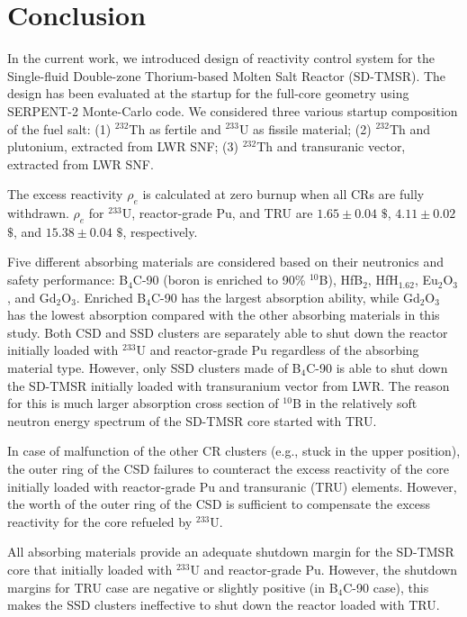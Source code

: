 \section{Conclusion} \label{Conclusion}
In the current work, we introduced design of reactivity control system for the 
Single-fluid Double-zone Thorium-based Molten Salt Reactor (SD-TMSR). The 
design has been evaluated at the startup for the full-core geometry using 
SERPENT-2 Monte-Carlo code. We considered three various startup composition of 
the fuel salt: (1) $^{232}$Th as fertile and $^{233}$U as fissile material; 
(2) $^{232}$Th and plutonium, extracted from \gls{LWR} \gls{SNF}; (3) 
$^{232}$Th and transuranic vector, extracted from \gls{LWR} \gls{SNF}.

The excess reactivity $\rho_e$ is calculated at zero burnup when all CRs are 
fully withdrawn. $\rho_e$ for $^{233}$U, reactor-grade Pu, and 
TRU are $1.65\pm0.04$ $\$$, $4.11\pm0.02$ $\$$, and $15.38\pm0.04$ $\$$, 
respectively.

Five different absorbing materials are considered based on their neutronics and 
safety performance: B$_4$C-90 (boron is enriched to 90\% $^{10}$B), HfB$_2$, 
HfH$_{1.62}$, Eu$_2$O$_3$, and Gd$_2$O$_3$. Enriched B$_4$C-90 has the largest 
absorption ability, while Gd$_2$O$_3$ has the lowest absorption compared with 
the other absorbing materials in this study. Both CSD and SSD clusters are 
separately able to shut down the reactor initially loaded with $^{233}$U and 
reactor-grade Pu regardless of the absorbing material type. However, only SSD 
clusters made of B$_4$C-90 is able to shut down the SD-TMSR initially loaded 
with transuranium vector from \gls{LWR}. The reason for this is much larger 
absorption cross section of $^{10}$B in the relatively soft neutron energy 
spectrum of the SD-TMSR core started with TRU.

In case of malfunction of the other CR clusters (e.g., stuck in the upper 
position), the outer ring of the CSD failures to counteract the excess 
reactivity of the core initially loaded with reactor-grade Pu and transuranic 
(TRU) elements. However, the worth of the outer ring of the CSD is sufficient 
to compensate the excess reactivity for the core refueled by $^{233}$U.

All absorbing materials provide an adequate shutdown margin for the SD-TMSR 
core that initially loaded with $^{233}$U and reactor-grade Pu. However, the 
shutdown margins for TRU case are negative or slightly positive (in B$_4$C-90 
case), this makes the SSD clusters ineffective to shut down the reactor loaded 
with TRU.


